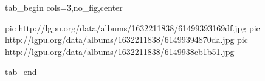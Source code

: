  
 
 
 
 


\ifcmt
  tab_begin cols=3,no_fig,center

     pic http://lgpu.org/data/albums/1632211838/61499393169df.jpg
		 pic http://lgpu.org/data/albums/1632211838/61499394870da.jpg
		 pic http://lgpu.org/data/albums/1632211838/6149938cb1b51.jpg

  tab_end
\fi
